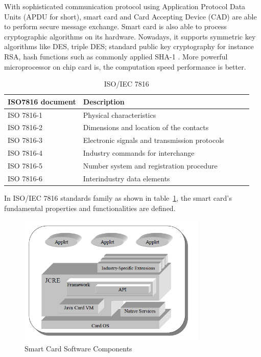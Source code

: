 With sophisticated communication protocol using Application Protocol Data Units (APDU for short), smart card and Card Accepting Device (CAD) are able to perform secure message exchange. Smart card is also able to process cryptographic algorithms on its hardware. Nowadays, it supports symmetric key algorithms like DES, triple DES; standard public key cryptography for instance RSA, hash functions such as commonly applied SHA-1 \cite{handbuch}. More powerful microprocessor on chip card is, the computation speed performance is better.  

\begin{table}[!htb]
\caption{ISO/IEC 7816 \cite{handbuch}}
\centering
\begin{tabular}{lllll}
 ISO7816 document & Description  \\[1ex]
\hline\hline
ISO 7816-1& Physical characteristics   \\
ISO 7816-2&  Dimensions and location of the contacts   \\
ISO 7816-3& Electronic signals and transmission protocols   \\
ISO 7816-4& Industry commands for interchange  \\
ISO 7816-5& Number system and registration procedure \\
ISO 7816-6& Interindustry data elements  \\
\hline
\end{tabular}
\label{table:ISO7816}
\end{table}

In ISO/IEC 7816 standards family as shown in table~\ref{table:ISO7816}, the smart card's fundamental properties and functionalities are defined.

\begin{figure}[!htbp]
	\centering
	\includegraphics[width=0.8\textwidth]{scc.jpg}
		\caption{Smart Card Software Components \cite{jcadg}}
	\label{fig:scc}
\end{figure}

